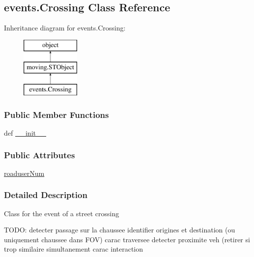 \hypertarget{classevents_1_1Crossing}{\subsection{events.\-Crossing Class Reference}
\label{classevents_1_1Crossing}
}
Inheritance diagram for events.\-Crossing\-:\begin{figure}[H]
\begin{center}
\leavevmode
\includegraphics[height=3.000000cm]{classevents_1_1Crossing}
\end{center}
\end{figure}
\subsubsection*{Public Member Functions}
\begin{DoxyCompactItemize}
\item 
def \hyperlink{classevents_1_1Crossing_a427a80cea52ac4e21c83f04874ab1aad}{\-\_\-\-\_\-init\-\_\-\-\_\-}
\end{DoxyCompactItemize}
\subsubsection*{Public Attributes}
\begin{DoxyCompactItemize}
\item 
\hyperlink{classevents_1_1Crossing_a9d2107493a5c79aa7e3556eade66bf1a}{roaduser\-Num}
\end{DoxyCompactItemize}


\subsubsection{Detailed Description}
\begin{DoxyVerb}Class for the event of a street crossing

TODO: detecter passage sur la chaussee
identifier origines et destination (ou uniquement chaussee dans FOV)
carac traversee
detecter proximite veh (retirer si trop similaire simultanement
carac interaction\end{DoxyVerb}
 

